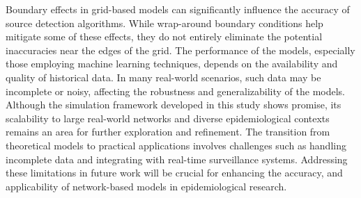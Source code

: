 Boundary effects in grid-based models can significantly influence the accuracy of source detection algorithms. While wrap-around boundary conditions help mitigate some of these effects, they do not entirely eliminate the potential inaccuracies near the edges of the grid. The performance of the models, especially those employing machine learning techniques, depends on the availability and quality of historical data. In many real-world scenarios, such data may be incomplete or noisy, affecting the robustness and generalizability of the models. Although the simulation framework developed in this study shows promise, its scalability to large real-world networks and diverse epidemiological contexts remains an area for further exploration and refinement. The transition from theoretical models to practical applications involves challenges such as handling incomplete data and integrating with real-time surveillance systems. Addressing these limitations in future work will be crucial for enhancing the accuracy, and applicability of network-based models in epidemiological research.
